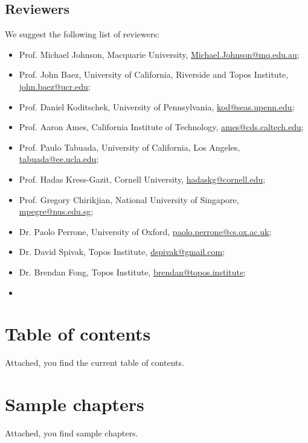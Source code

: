 \documentclass[10pt, article, one side]{memoir}
\begin{document}
    \section{Reviewers}
    We suggest the following list of reviewers:
    \begin{itemize}
        \item Prof.
              Michael Johnson, Macquarie University, \href{mailto:Michael.Johnson@mq.edu.au}{Michael.Johnson@mq.edu.au};
        \item Prof.
              John Baez, University of California, Riverside and Topos Institute, \href{mailto:john.baez@ucr.edu}{john.baez@ucr.edu};
        \item Prof.
              Daniel Koditschek, University of Pennsylvania, \href{mailto:kod@seas.upenn.edu}{kod@seas.upenn.edu};
        \item Prof.
              Aaron Ames, California Institute of Technology, \href{mailto:ames@cds.caltech.edu}{ames@cds.caltech.edu};
        \item Prof.
              Paulo Tabuada, University of California, Los Angeles, \href{mailto:tabuada@ee.ucla.edu}{tabuada@ee.ucla.edu};
        \item Prof.
              Hadas Kress-Gazit, Cornell University, \href{mailto:hadaskg@cornell.edu}{hadaskg@cornell.edu};
        \item Prof.
              Gregory Chirikjian, National University of Singapore, \href{mailto:mpegre@nus.edu.sg}{mpegre@nus.edu.sg};
        \item Dr.
              Paolo Perrone, University of Oxford, \href{mailto:paolo.perrone@cs.ox.ac.uk}{paolo.perrone@cs.ox.ac.uk};
        \item Dr.
              David Spivak, Topos Institute, \href{mailto:dspivak@gmail.com}{dspivak@gmail.com};
        \item Dr.
              Brendan Fong, Topos Institute, \href{mailto:brendan@topos.institute}{brendan@topos.institute};
        \item {}
    \end{itemize}

    \chapter{Table of contents}
    Attached, you find the current table of contents.

    \chapter{Sample chapters}
    Attached, you find sample chapters.
    
\end{document}
